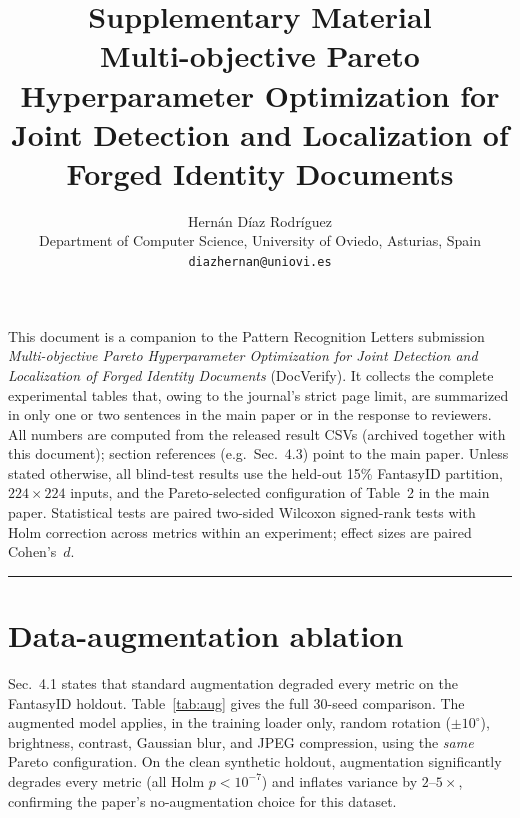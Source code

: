 \documentclass[11pt]{article}
\title{\textbf{Supplementary Material}\\[4pt]
\large Multi-objective Pareto Hyperparameter Optimization for Joint
Detection and Localization of Forged Identity Documents}
\author{Hern\'{a}n D\'{i}az Rodr\'{i}guez\\
\small Department of Computer Science, University of Oviedo, Asturias, Spain\\
\small \texttt{diazhernan@uniovi.es}}
\date{}
\begin{document}
\maketitle

\noindent
This document is a companion to the Pattern Recognition Letters submission
\emph{Multi-objective Pareto Hyperparameter Optimization for Joint Detection
and Localization of Forged Identity Documents} (DocVerify). It collects the
complete experimental tables that, owing to the journal's strict page limit,
are summarized in only one or two sentences in the main paper or in the
response to reviewers. All numbers are computed from the released result CSVs
(archived together with this document); section references (e.g.\ Sec.~4.3)
point to the main paper. Unless stated otherwise, all blind-test results use
the held-out 15\% FantasyID partition, $224\times224$ inputs, and the
Pareto-selected configuration of Table~2 in the main paper. Statistical tests
are paired two-sided Wilcoxon signed-rank tests with Holm correction across
metrics within an experiment; effect sizes are paired Cohen's~$d$.

\tableofcontents
\vspace{6pt}
\hrule

\section{Data-augmentation ablation}
\label{sec:aug}

Sec.~4.1 states that standard augmentation degraded every metric on the
FantasyID holdout. Table~\ref{tab:aug} gives the full 30-seed comparison.
The augmented model applies, in the training loader only, random rotation
($\pm10^\circ$), brightness, contrast, Gaussian blur, and JPEG compression,
using the \emph{same} Pareto configuration. On the clean synthetic holdout,
augmentation significantly degrades every metric (all Holm $p<10^{-7}$) and
inflates variance by $2$--$5\times$, confirming the paper's no-augmentation
choice for this dataset.
\end{document}
